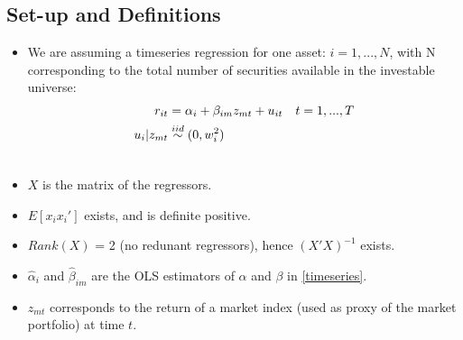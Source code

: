 \documentclass[]{article}
\begin{document}
\subsection{Set-up and Definitions}
\begin{itemize}
	\item We are assuming a timeseries regression for one asset: $i=1,...,N$, with N corresponding to the total number of securities available in the investable universe:
	\begin{align} \label{timeseries}
		r_{it} &= \alpha_i + \beta_{im} z_{mt} + u_{it} \quad t = 1,...,T \\ 
		u_i|z_{mt} &\overset{iid}{\sim} (0, w_{i}^2) \notag \\ \notag
	\end{align} \vspace{-3em}
	\item $X$ is the matrix of the regressors.	
	\item $E[x_ix_i']$ exists, and is definite positive.	
	\item ${Rank}(X)$ = 2 (no redunant regressors), hence $(X'X)^{-1}$ exists.	
	\item $\hat{\alpha}_i$ and $\hat{\beta}_{im}$ are the OLS estimators of $\alpha$ and $\beta$ in \ref{timeseries}.
	\item $z_{mt}$ corresponds to the return of a market index (used as proxy of the market portfolio) at time $t$. 
\end{itemize}
\end{document}
